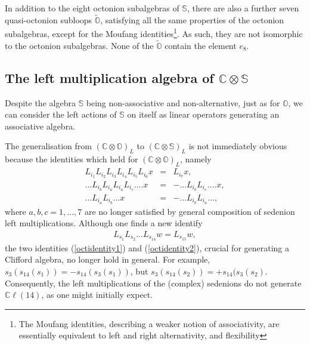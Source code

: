 \documentclass{article}
\newcommand{\bb}[1]{\mathbb{#1}}
\begin{document}
In addition to the eight octonion subalgebras of $\bb{S}$, there are also a further seven quasi-octonion subloops $\tilde{\bb{O}}$, satisfying all the same properties of the octonion subalgebras, except for the Moufang identities\footnote{The Moufang identities, describing a weaker notion of associativity, are essentially equivalent to left and right alternativity, and flexibility}. As such, they are not isomorphic to the octonion subalgebras. None of the $\tilde{\bb{O}}$ contain the element $e_8$.


\subsection{The left multiplication algebra of $\bb{C}\otimes\bb{S}$}

Despite the algebra $\bb{S}$ being non-associative and non-alternative, just as for $\bb{O}$, we can consider the left actions of $\bb{S}$ on itself as linear operators generating an associative algebra. %

The generalisation from $(\bb{C}\otimes\bb{O})_L$ to $(\bb{C}\otimes\bb{S})_L$ is not immediately obvious because the identities which held for $(\bb{C}\otimes\bb{O})_L$, namely
\begin{eqnarray}
    L_{i_1}L_{i_2}L_{i_3}L_{i_4}L_{i_5}L_{i_6}x&=&L_{i_7}x,\\
    ...L_{i_b}L_{i_a}L_{i_a}L_{i_c}....x&=&-...L_{i_b}L_{i_c}....x,\label{octidentity1}\\
    ...L_{i_a}L_{i_b}...x&=&-...L_{i_b}L_{i_a}...,\label{octidentity2}
\end{eqnarray}
where $a,b,c=1,...,7$ are no longer satisfied by general composition of sedenion left multiplications. Although one finds a new identify
\begin{align}
\label{sedenionidentity}
L_{s_1}L_{s_2}...L_{s_{14}}w=L_{s_{15}}w,
\end{align}
the two identities (\ref{octidentity1}) and (\ref{octidentity2}), crucial for generating a Clifford algebra, no longer hold in general. For example, $s_3(s_{14}(s_1)) = -s_{14}(s_3(s_1))$, but $s_3(s_{14}(s_2)) = +s_{14}(s_3(s_2)$. 
Consequently, the left multiplications of the (complex) sedenions do not generate $\bb{C}\ell(14)$, as one might initially expect.
\end{document}
